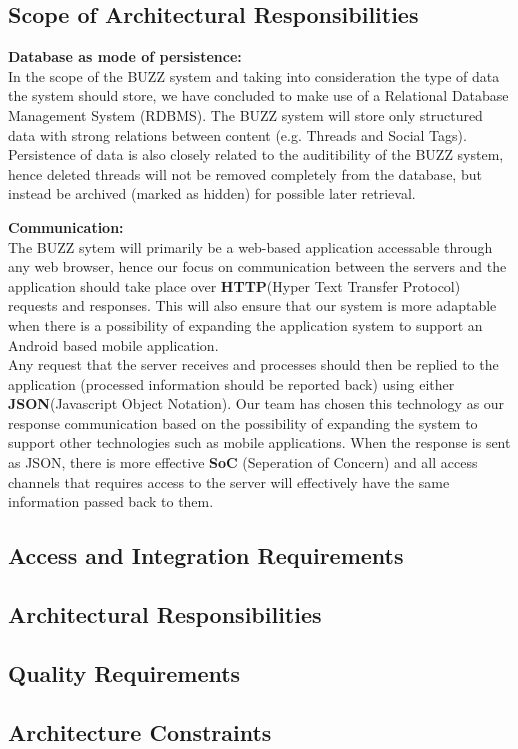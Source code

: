 
\subsection{Scope of Architectural Responsibilities}
\begin{flushleft}
	\begin{flushleft}
	\textbf{Database as mode of persistence: } \\
	In the scope of the BUZZ system and taking into consideration the type of data the system should store, we have concluded to make use of a Relational Database Management System (RDBMS). The BUZZ system will store only structured data with strong relations between content (e.g. Threads and Social Tags). Persistence of data is also closely related to the auditibility of the BUZZ system, hence deleted threads will not be removed completely from the database, but instead be archived (marked as hidden) for possible later retrieval.
	\end{flushleft}
	
	\begin{flushleft}
	\textbf{Communication:}\\
	The BUZZ sytem will primarily be a web-based application accessable through any web browser, hence our focus on communication between the servers and the application should take place over \textbf{HTTP}(Hyper Text Transfer Protocol) requests and responses. This will also ensure that our system is more adaptable when there is a possibility of expanding the application system to support an Android based mobile application. \\
	Any request that the server receives and processes should then be replied to the application (processed information should be reported back) using either \textbf{JSON}(Javascript Object Notation). Our team has chosen this technology as our response communication based on the possibility of expanding the system to support other technologies such as mobile applications. When the response is sent as JSON, there is more effective \textbf{SoC} (Seperation of Concern) and all access channels that requires access to the server will effectively have the same information passed back to them.
	\end{flushleft}
\end{flushleft}

\subsection{Access and Integration Requirements}
\subsection{Architectural Responsibilities}
\subsection{Quality Requirements}
	
	
\subsection{Architecture Constraints}